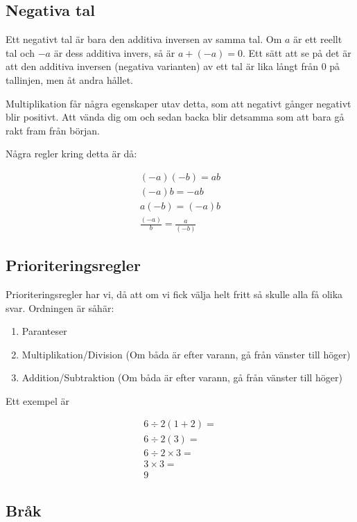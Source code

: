 \subsection{Negativa tal}

Ett negativt tal är bara den additiva inversen av samma tal. Om $a$ är ett reellt tal och $-a$ är dess additiva invers, så är $a+(-a)=0$. Ett sätt att se på det är att den additiva inversen (negativa varianten) av ett tal är lika långt från $0$ på tallinjen, men åt andra hållet. 

Multiplikation får några egenskaper utav detta, som att negativt gånger negativt blir positivt. Att vända dig om och sedan backa blir detsamma som att bara gå rakt fram från början.

Några regler kring detta är då:

\begin{align}
	(-a)(-b) = ab \\
	(-a)b = -ab \\
	a(-b) = (-a)b \\
	\frac{(-a)}{b} = \frac{a}{(-b)}
\end{align}

\newpage
\subsection{Prioriteringsregler}

Prioriteringsregler har vi, då att om vi fick välja helt fritt så skulle alla få olika svar. Ordningen är såhär:

\begin{enumerate}
	\item Paranteser
	\item Multiplikation/Division (Om båda är efter varann, gå från vänster till höger)
	\item Addition/Subtraktion (Om båda är efter varann, gå från vänster till höger)
\end{enumerate}

Ett exempel är 

\begin{align*}
	6\div 2(1+2) = \\
	6\div 2(3) = \\
	6\div 2 \times 3 = \\
	3 \times 3 = \\
	9
\end{align*}

\newpage
\subsection{Bråk}

